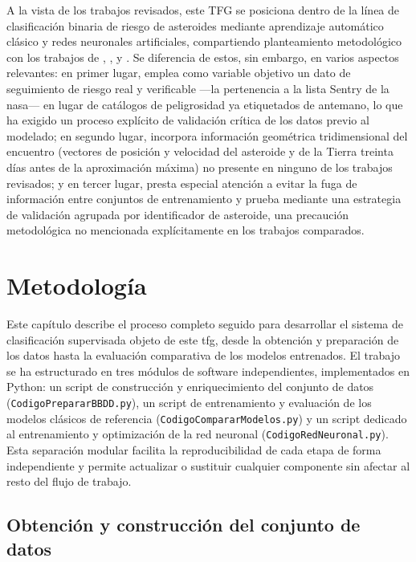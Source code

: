 \documentclass[12pt]{report} %
\begin{document}
A la vista de los trabajos revisados, este TFG se posiciona dentro de la línea de clasificación binaria de riesgo de asteroides mediante aprendizaje automático clásico y redes neuronales artificiales, compartiendo planteamiento metodológico con los trabajos de \cite{hefele2020identifying}, \cite{linares2016space}, \cite{chandra2025enhanced} y \cite{mondal2025multimodel}. Se diferencia de estos, sin embargo, en varios aspectos relevantes: en primer lugar, emplea como variable objetivo un dato de seguimiento de riesgo real y verificable ---la pertenencia a la lista Sentry de la \gls{nasa}--- en lugar de catálogos de peligrosidad ya etiquetados de antemano, lo que ha exigido un proceso explícito de validación crítica de los datos previo al modelado; en segundo lugar, incorpora información geométrica tridimensional del encuentro (vectores de posición y velocidad del asteroide y de la Tierra treinta días antes de la aproximación máxima) no presente en ninguno de los trabajos revisados; y en tercer lugar, presta especial atención a evitar la fuga de información entre conjuntos de entrenamiento y prueba mediante una estrategia de validación agrupada por identificador de asteroide, una precaución metodológica no mencionada explícitamente en los trabajos comparados.


\chapter{Metodología}
 
Este capítulo describe el proceso completo seguido para desarrollar el sistema de clasificación supervisada objeto de este \gls{tfg}, desde la obtención y preparación de los datos hasta la evaluación comparativa de los modelos entrenados. El trabajo se ha estructurado en tres módulos de software independientes, implementados en Python: un script de construcción y enriquecimiento del conjunto de datos (\texttt{CodigoPrepararBBDD.py}), un script de entrenamiento y evaluación de los modelos clásicos de referencia (\texttt{CodigoCompararModelos.py}) y un script dedicado al entrenamiento y optimización de la red neuronal (\texttt{CodigoRedNeuronal.py}). Esta separación modular facilita la reproducibilidad de cada etapa de forma independiente y permite actualizar o sustituir cualquier componente sin afectar al resto del flujo de trabajo.
 
\section{Obtención y construcción del conjunto de datos}
 
\end{document}
